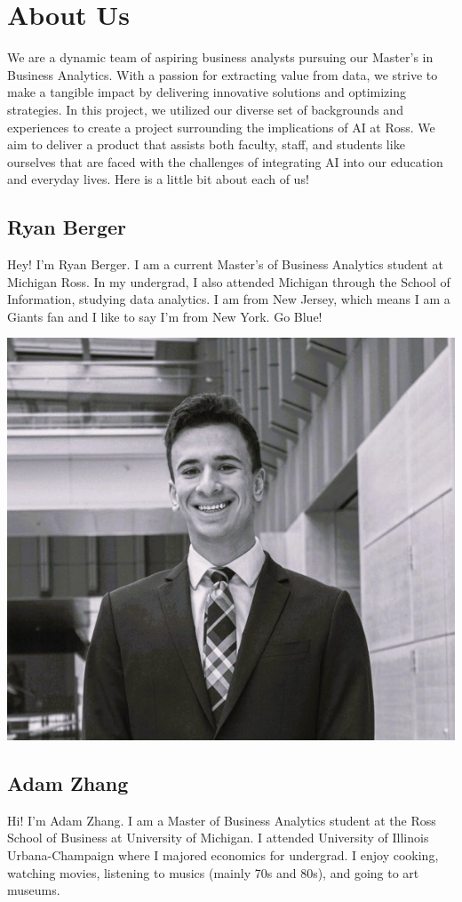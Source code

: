 \documentclass[
]{book}
\begin{document}
\hypertarget{about-us}{%
\chapter{About Us}\label{about-us}}

We are a dynamic team of aspiring business analysts pursuing our Master's in Business Analytics. With a passion for extracting value from data, we strive to make a tangible impact by delivering innovative solutions and optimizing strategies. In this project, we utilized our diverse set of backgrounds and experiences to create a project surrounding the implications of AI at Ross. We aim to deliver a product that assists both faculty, staff, and students like ourselves that are faced with the challenges of integrating AI into our education and everyday lives. Here is a little bit about each of us!

\hypertarget{ryan-berger}{%
\section{Ryan Berger}\label{ryan-berger}}

Hey! I'm Ryan Berger. I am a current Master's of Business Analytics student at Michigan Ross. In my undergrad, I also attended Michigan through the School of Information, studying data analytics. I am from New Jersey, which means I am a Giants fan and I like to say I'm from New York. Go Blue!

\includegraphics[width=0.4\linewidth]{rtberger}

\hypertarget{adam-zhang}{%
\section{Adam Zhang}\label{adam-zhang}}

Hi! I'm Adam Zhang. I am a Master of Business Analytics student at the Ross School of Business at University of Michigan. I attended University of Illinois Urbana-Champaign where I majored economics for undergrad. I enjoy cooking, watching movies, listening to musics (mainly 70s and 80s), and going to art museums.
\end{document}

